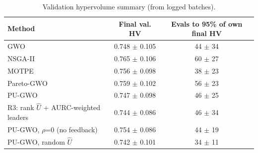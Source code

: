 \begin{table}[t]
\centering
\caption{Validation hypervolume summary (from logged batches).}
\label{tab:table_hv_summary}
\small
\begin{tabular}{lcc}
\toprule
Method & Final val. HV & Evals to 95\% of own final HV \\
\midrule
GWO & 0.748 $\pm$ 0.105 & 44 $\pm$ 34 \\
NSGA-II & 0.765 $\pm$ 0.106 & 60 $\pm$ 27 \\
MOTPE & 0.756 $\pm$ 0.098 & 38 $\pm$ 23 \\
Pareto-GWO & 0.759 $\pm$ 0.102 & 56 $\pm$ 23 \\
PU-GWO & 0.747 $\pm$ 0.098 & 46 $\pm$ 25 \\
R3: rank $\hat{U}$ + AURC-weighted leaders & 0.744 $\pm$ 0.086 & 46 $\pm$ 34 \\
PU-GWO, $\rho$=0 (no feedback) & 0.754 $\pm$ 0.086 & 44 $\pm$ 19 \\
PU-GWO, random $\hat{U}$ & 0.742 $\pm$ 0.101 & 34 $\pm$ 11 \\
\bottomrule
\end{tabular}
\end{table}
